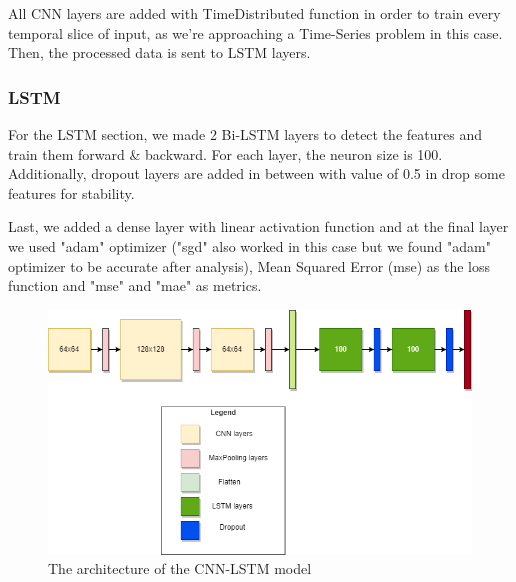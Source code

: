 \documentclass[conference]{IEEEtran}
\begin{document}
All CNN layers are added with TimeDistributed function in order to train every temporal slice of input, as we're approaching a Time-Series problem in this case. Then, the processed data is sent to LSTM layers.

\subsubsection{LSTM}
For the LSTM section, we made 2 Bi-LSTM layers to detect the features and train them forward \& backward. For each layer, the neuron size is 100. Additionally, dropout layers are added in between with value of 0.5 in drop some features for stability.

Last, we added a dense layer with linear activation function and at the final layer we used "adam" optimizer ("sgd" also worked in this case but we found "adam" optimizer to be accurate after analysis), Mean Squared Error (mse) as the loss function and "mse" and "mae" as metrics.

\begin{figure}[htbp]
	\centerline{\includegraphics[scale=0.6]{MOD.png}}
	\caption{The architecture of the CNN-LSTM model}
	\label{modelx}
\end{figure}
\end{document}

